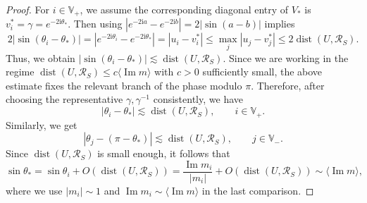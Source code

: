 \documentclass[11pt,twoside, a4paper]{article}
\numberwithin{equation}{section}
\numberwithin{figure}{section}
\theoremstyle{plain} %
\theoremstyle{definition}
\theoremstyle{remark}
\newcommand{\1} {\mspace{1 mu}}
\newcommand{\2} {\mspace{2 mu}}
\DeclareMathOperator{\im}{Im}
\DeclareMathOperator{\dist}{dist}
\begin{document}
\begin{proof}
    For \(i\in\mathbb V_+\), we assume the corresponding diagonal entry of \(V_*\) is
    \(v^*_i=\gamma=e^{-2\mathrm i\theta_*}\). Then using $|e^{-2\mathrm ia}-e^{-2\mathrm ib}|=2|\sin(a-b)|$ implies
    \[
        2|\sin(\theta_i-\theta_*)|=|e^{-2\mathrm i\theta_i}-e^{-2\mathrm i\theta_*}|
        =
        |u_i-v^*_i|
        \le \max_j |u_j-v^*_j|
        \le 2\dist(U,\mathscr R_S).
    \]
    Thus, we obtain
    $
        |\sin(\theta_i-\theta_*)|
        \lesssim \dist(U,\mathscr R_S).
    $
    Since we are working in the regime
    \(\dist(U,\mathscr R_S)\le c\langle\im m\rangle\) with \(c>0\) sufficiently small,
    the above estimate fixes the relevant branch of the phase modulo \(\pi\). Therefore,
    after choosing the representative $\gamma,\gamma^{-1}$ consistently, we have
    \begin{equation}\label{eq.phase-close-plus-symmetric}
        |\theta_i-\theta_*|
        \lesssim \dist(U,\mathscr{R}_{S}),
        \qquad i\in\mathbb V_+ .
    \end{equation}
    Similarly, we get
    \begin{equation}\label{eq.phase-close-minus-symmetric}
        |\theta_j-(\pi-\theta_*)|\lesssim \dist(U,\mathscr{R}_{S}),
        \qquad j\in\mathbb V_- .
    \end{equation}
    Since $\dist(U,\mathscr{R}_S)$ is small enough, it follows that
    \begin{equation}\label{eq.sin-theta-star-symmetric}
      \sin\theta_*
        =
        \sin\theta_i+O(\dist(U,\mathscr{R}_{S}))
        =
        \frac{\im m_i}{|m_i|}+O(\dist(U,\mathscr{R}_{S}))
        \sim
        \langle\im m\rangle,
    \end{equation}
    where we use $|m_i|\sim 1$ and $\im m_i\sim\langle\im m\rangle$ in the last comparison.


\end{proof}
\end{document}
